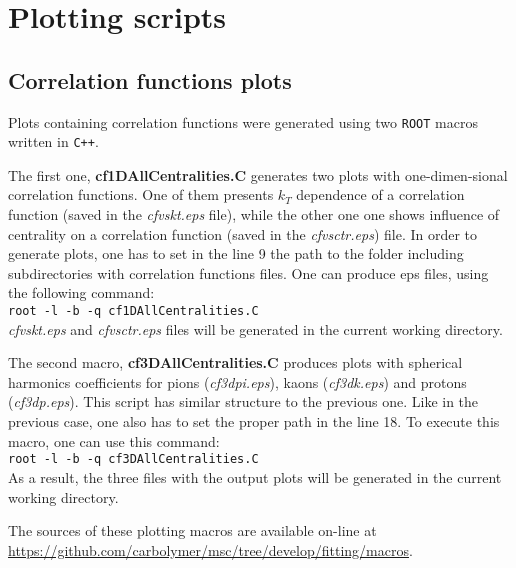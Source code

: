 %
\chapter{Plotting scripts}
\label{a:c}
  \section{Correlation functions plots}
    Plots containing correlation functions were generated using two \verb|ROOT| macros written in \verb|C++|.
    
    The first one, \textbf{cf1DAllCentralities.C} generates two plots with one-dimen-sional correlation functions.
    One of them presents $k_T$ dependence of a correlation function (saved in the \textit{cfvskt.eps} file), while the other one one shows influence of centrality on a correlation function (saved in the \textit{cfvsctr.eps}) file.
    In order to generate plots, one has to set in the line 9 the path to the folder including subdirectories with correlation functions files.
    One can produce eps files, using the following command:\\
    \verb|root -l -b -q cf1DAllCentralities.C|\\
    \textit{cfvskt.eps} and \textit{cfvsctr.eps} files will be generated in the current working directory.

    The second macro, \textbf{cf3DAllCentralities.C} produces plots with spherical harmonics coefficients for pions (\textit{cf3dpi.eps}), kaons (\textit{cf3dk.eps}) and protons (\textit{cf3dp.eps}).
    This script has similar structure to the previous one.
    Like in the previous case, one also has to set the proper path in the line 18.
    To execute this macro, one can use this command:\\
    \verb|root -l -b -q cf3DAllCentralities.C|\\
    As a result, the three files with the output plots will be generated in the current working directory.

    The sources of these plotting macros are available on-line at \url{https://github.com/carbolymer/msc/tree/develop/fitting/macros}.
